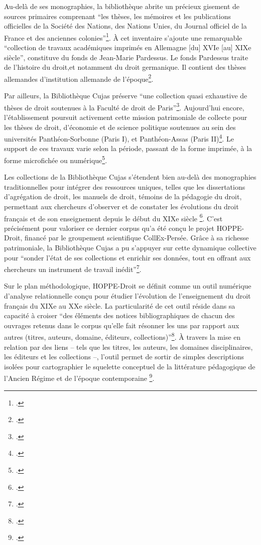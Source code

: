 Au-delà de ses monographies, la bibliothèque abrite un précieux gisement de sources primaires comprenant \enquote{les thèses, les mémoires et les publications officielles de la Société des Nations, des Nations Unies, du Journal officiel de la France et des anciennes colonies}\footcite{BibliothequeInteruniversitaireCujas}. À cet inventaire s'ajoute une remarquable \enquote{collection de travaux académiques imprimés en Allemagne [du] XVIe [au] XIXe siècle}, constituve du fonds de Jean-Marie Pardessus. Le fonds Pardessus traite de l'histoire du droit,et notamment du droit germanique. Il contient des thèses allemandes d'institution allemande de l'époque\footcite{BibliothequeInteruniversitaireCujas}. 

Par ailleurs, la Bibliothèque Cujas préserve \enquote{une collection quasi exhaustive de thèses de droit soutenues à la Faculté de droit de Paris}\footcite{BibliothequeInteruniversitaireCujas}. Aujourd'hui encore, l'établissement poursuit activement cette mission patrimoniale de collecte pour les thèses de droit, d'économie et de science politique soutenues au sein des universités Panthéon-Sorbonne (Paris I), et Panthéon-Assas (Paris II)\footcite{HistoireMissionsPartenariats}. Le support de ces travaux varie selon la période, passant de la forme imprimée, à la forme microfichée ou numérique\footcite{BibliothequeInteruniversitaireCujas}.

Les collections de la Bibliothèque Cujas s'étendent bien au-delà des monographies traditionnelles pour intégrer des ressources uniques, telles que les dissertations d'agrégation de droit, les manuels de droit, témoins de la pédagogie du droit, permettant aux chercheurs d'observer et de constater les évolutions du droit français et de son enseignement depuis le début du XIXe siècle \footcite{HoppeDroit}. C'est précisément pour valoriser ce dernier corpus qu'a été conçu le projet \ac{HOPPE-Droit}, financé par le groupement scientifique CollEx-Persée. Grâce à sa richesse patrimoniale, la Bibliothèque Cujas a pu s'appuyer sur cette dynamique collective pour \enquote{sonder l'état de ses collections et enrichir ses données, tout en offrant aux chercheurs un instrument de travail inédit}\footcite{HoppeDroit}. 

Sur le plan méthodologique, \ac{HOPPE-Droit} se définit comme un outil numérique d'analyse relationnelle conçu pour étudier l'évolution de l'enseignement du droit français du XIXe au XXe siècle. La particularité de cet outil réside dans sa capacité à croiser \enquote{des éléments des notices bibliographiques de chacun des ouvrages retenus dans le corpus qu'elle fait résonner les uns par rapport aux autres (titres, auteurs, domaine, éditeurs, collections)}\footcite{HoppeDroit}. À travers la mise en relation par des liens -- tels que les titres, les auteurs, les domaines disciplinaires, les éditeurs et les collections --, l'outil permet de sortir de simples descriptions isolées pour cartographier le squelette conceptuel de la littérature pédagogique de l'Ancien Régime et de l'époque contemporaine \footcite{HoppeDroit}.

